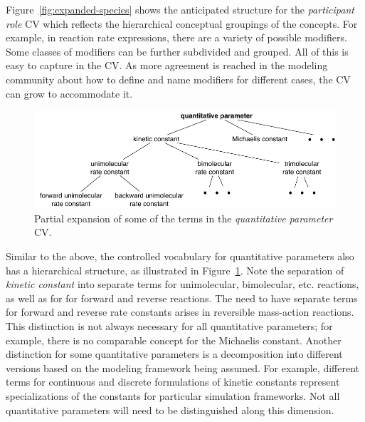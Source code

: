 Figure~\ref{fig:expanded-species} shows the anticipated structure
for the \emph{participant role} CV which reflects the hierarchical
conceptual groupings of the concepts. For example, in reaction
rate expressions, there are a variety of possible modifiers.  Some
classes of modifiers can be further subdivided and grouped.  All
of this is easy to capture in the CV.  As more agreement is
reached in the modeling community about how to define and name
modifiers for different cases, the CV can grow to accommodate it.

\begin{figure}[tbh]
  \vspace*{2ex}
  \centering
  \includegraphics[scale = 0.9]{figs/sbo-quantitative-parameter}
  \caption{Partial expansion of some of the terms in the \emph{quantitative
      parameter} CV.}
  \label{fig:expanded-parameter}
\end{figure}

Similar to the above, the controlled vocabulary for quantitative
parameters also has a hierarchical structure, as illustrated in
Figure~\ref{fig:expanded-parameter}.  Note the separation of
\emph{kinetic constant} into separate terms for unimolecular,
bimolecular, etc. reactions, as well as for for forward and
reverse reactions.  The need to have separate terms for forward
and reverse rate constants arises in reversible mass-action
reactions.  This distinction is not always necessary for all
quantitative parameters; for example, there is no comparable
concept for the Michaelis constant.  Another distinction for some
quantitative parameters is a decomposition into different versions
based on the modeling framework being assumed.  For example,
different terms for continuous and discrete formulations of
kinetic constants represent specializations of the constants for
particular simulation frameworks.  Not all quantitative parameters
will need to be distinguished along this dimension.

